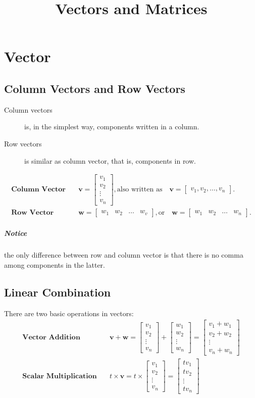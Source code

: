 \documentclass{article}
\newcommand{\vecs}[1]{\boldsymbol{#1}}
\newcommand{\cvec}[2]{\begin{bmatrix}#1_1\\#1_2\\\vdots\\#1_#2\end{bmatrix}}
\newcommand{\cvecs}[2]{\begin{bmatrix}#1_1,#1_2,\dots,#1_#2\end{bmatrix}}
\newcommand{\rvec}[2]{\begin{bmatrix}#1_1&#1_2&\ldots&#1_#2\end{bmatrix}}
\newcommand{\rvecs}[2]{\begin{bmatrix}#1_1&#1_2&\dots&#1_#2\end{bmatrix}}
\begin{document}
    \title{Vectors and Matrices}
    \author{}
    \date{}
    \maketitle

    \section{Vector}

    \subsection{Column Vectors and Row Vectors}

    \begin{description}
        \item[Column vectors] is, in the simplest way, components written in a column.
        \item[Row vectors] is similar as column vector, that is, components in row.
    \end{description}

    \begin{align*}
        \textbf{Column Vector}&\quad\vecs{v}=\cvec{v}{n},\text{also written as}\quad\vecs{v}=\cvecs{v}{n}.\\
        \textbf{Row Vector}&\quad\vecs{w}=\rvec{w}{v},\text{or}\quad\vecs{w}=\rvecs{w}{n}.
    \end{align*}
    
    
    \subparagraph*{Notice}the only difference between row and column vector is that there is no comma among components in the latter.

    \subsection{Linear Combination}

    There are two basic operations in vectors:
    \begin{align*}
        \textbf{Vector Addition}&\quad\vecs{v}+\vecs{w}=\cvec{v}{n}+\cvec{w}{n}=\begin{bmatrix}v_1+w_1\\v_2+w_2\\\vdots\\v_n+w_n\end{bmatrix}\\
        \textbf{Scalar Multiplication}&\quad t\times\vecs{v}=t\times\cvec{v}{n}=\cvec{tv}{n}
    \end{align*}
\end{document}
